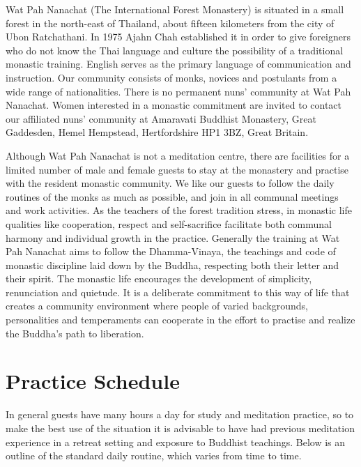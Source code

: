 
Wat Pah Nanachat (The International Forest Monastery) is situated in a
small forest in the north-east of Thailand, about fifteen kilometers
from the city of Ubon Ratchathani. In 1975 Ajahn Chah established it in
order to give foreigners who do not know the Thai language and culture
the possibility of a traditional monastic training. English serves as
the primary language of communication and instruction. Our community
consists of monks, novices and postulants from a wide range of
nationalities. There is no permanent nuns' community at Wat Pah
Nanachat. Women interested in a monastic commitment are invited to
contact our affiliated nuns' community at Amaravati Buddhist Monastery,
Great Gaddesden, Hemel Hempstead, Hertfordshire HP1 3BZ, Great Britain.

Although Wat Pah Nanachat is not a meditation centre, there are
facilities for a limited number of male and female guests to stay at the
monastery and practise with the resident monastic community. We like our
guests to follow the daily routines of the monks as much as possible,
and join in all communal meetings and work activities. As the teachers
of the forest tradition stress, in monastic life qualities like
cooperation, respect and self-sacrifice facilitate both communal harmony
and individual growth in the practice. Generally the training at Wat Pah
Nanachat aims to follow the Dhamma-Vinaya, the teachings and code of
monastic discipline laid down by the Buddha, respecting both their
letter and their spirit. The monastic life encourages the development of
simplicity, renunciation and quietude. It is a deliberate commitment to
this way of life that creates a community environment where people of
varied backgrounds, personalities and temperaments can cooperate in the
effort to practise and realize the Buddha's path to
liberation.

\section{Practice Schedule}

In general guests have many
hours a day for study and meditation practice, so to make the best use
of the situation it is advisable to have had previous meditation
experience in a retreat setting and exposure to Buddhist teachings.
Below is an outline of the standard daily routine, which varies from
time to time.

%

